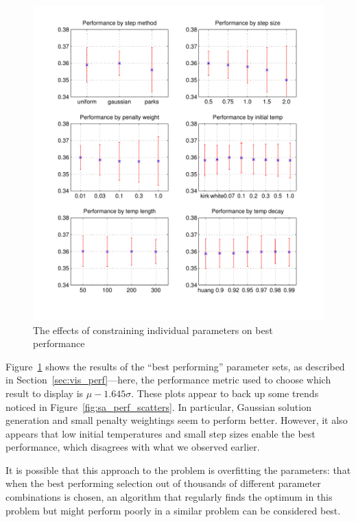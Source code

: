 \documentclass[10pt]{article}
\begin{document}
\begin{figure}[tbp]
  \begin{center}
    \includegraphics[width=13cm]{sa_plots.pdf}
    \end{center}
    \caption{The effects of constraining individual parameters on best
    performance}
    \label{fig:sa_plots}
    \end{figure}

Figure~\ref{fig:sa_plots} shows the results of the ``best performing''
parameter sets, as described in Section~\ref{sec:vis_perf}---here, the
performance metric used to choose which result to display is $\mu - 1.645
\sigma$. These plots appear to back up some trends noticed in
Figure~\ref{fig:sa_perf_scatters}. In particular, Gaussian solution generation
and small penalty weightings seem to perform better. However, it also appears
that low initial temperatures and small step sizes enable the best
performance, which disagrees with what we observed earlier.

It is possible that this approach to the problem is overfitting the
parameters: that when the best performing selection out of thousands of
different parameter combinations is chosen, an algorithm that regularly finds
the optimum in this problem but might perform poorly in a similar problem can
be considered best.
\end{document}
